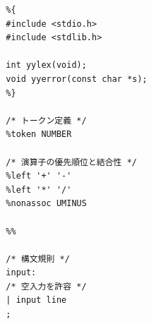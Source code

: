 \documentclass[dvipdfmx]{jarticle}
\begin{document}
\begin{Verbatim}
  %{
  #include <stdio.h>
  #include <stdlib.h>

  int yylex(void);
  void yyerror(const char *s);
  %}

  /* トークン定義 */
  %token NUMBER

  /* 演算子の優先順位と結合性 */
  %left '+' '-'
  %left '*' '/'
  %nonassoc UMINUS

  %%

  /* 構文規則 */
  input:
  /* 空入力を許容 */
  | input line
  ;
\end{Verbatim}
\end{document}
